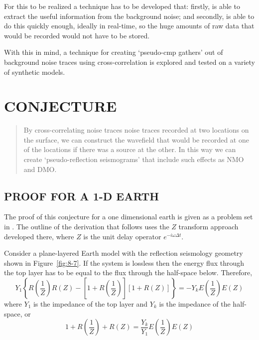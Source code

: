 For this to be realized a technique has to be developed that: firstly, is 
able to extract the useful information from the background noise; and 
secondly, is able to do this quickly enough, ideally in real-time, so 
the huge amounts of raw data that would be recorded would not have to be 
stored.

With this in mind, a technique for creating `pseudo-cmp gathers' 
out of background noise traces using cross-correlation is explored 
and tested on a variety of synthetic models.

\section{CONJECTURE}

\begin{quotation}
By cross-correlating noise traces noise traces recorded at two locations 
on the surface, we can construct the wavefield that would be recorded at 
one of the locations if there was a source at the other.
In this way we can create `pseudo-reflection seismograms' that include 
such effects as NMO and DMO.
\end{quotation}

\subsection{PROOF FOR A 1-D EARTH}
  
The proof of this conjecture for a one dimensional earth is given as a 
problem set in \cite{fgdp}. 
The outline of the derivation that follows uses 
the $Z$ transform approach developed there, where $Z$ is the unit 
delay operator $e^{-i\omega \Delta t}$.

Consider a plane-layered Earth model with the reflection seismology 
geometry shown in Figure~\ref{fig:8-7}. If the system is lossless then the energy
flux through the top layer has to be equal to the 
flux through the half-space below.  Therefore,
\begin{equation}
Y_1 \left\{ R\left(\frac{1}{Z}\right) R(Z) - 
\left[1+R\left(\frac{1}{Z}\right) \right]
[1+R(Z)] \right\} = - Y_k E\left(\frac{1}{Z}\right) E(Z)
\end{equation}
where $Y_1$ is the impedance of the top layer and $Y_k$ is the impedance 
of the half-space, or
\begin{equation}
1 + R\left(\frac{1}{Z}\right) + R(Z) = \frac{Y_k}{Y_1} 
E\left(\frac{1}{Z}\right) E(Z)
\end{equation}

